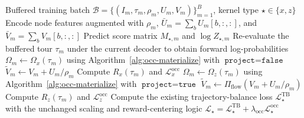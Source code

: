 \begin{algorithm}[t]
\caption{\textsc{KernelTrainStep}}
\label{alg:occ-kernel-step}
\begin{algorithmic}[1]
\REQUIRE Buffered training batch $\mathcal{B}=\{(I_m,\tau_m,\rho_m,U_m,V_m)\}_{m=1}^{B}$, kernel type $\star\in\{x,z\}$
    \STATE Encode node features augmented with $\rho_m$, $\bar U_m=\sum_b U_m[b,:,:]$, and $\bar V_m=\sum_b V_m[b,:,:]$
    \STATE Predict score matrix $M_{\star,m}$ and $\log Z_{\star,m}$
    \STATE Re-evaluate the buffered tour $\tau_m$ under the current decoder to obtain forward log-probabilities
        \STATE $\Omega_m \leftarrow \Omega_x(\tau_m)$ using Algorithm~\ref{alg:occ-materialize} with $\texttt{project}=\texttt{false}$
        \STATE $\widetilde V_m \leftarrow V_m + U_m/\rho_m$
        \STATE Compute $R_x(\tau_m)$ and $\mathcal{L}^{\mathrm{occ}}_x$
    \ELSE
        \STATE $\Omega_m \leftarrow \Omega_z(\tau_m)$ using Algorithm~\ref{alg:occ-materialize} with $\texttt{project}=\texttt{true}$
        \STATE $\widetilde V_m \leftarrow \Pi_{\mathrm{flow}}(V_m + U_m/\rho_m)$
        \STATE Compute $R_z(\tau_m)$ and $\mathcal{L}^{\mathrm{occ}}_z$
    \ENDIF
    \STATE Compute the existing trajectory-balance loss $\mathcal{L}^{\mathrm{TB}}_\star$ with the unchanged scaling and reward-centering logic
\ENDFOR
\STATE \RETURN $\mathcal{L}_\star=\mathcal{L}^{\mathrm{TB}}_\star+\lambda_{\mathrm{occ}}\mathcal{L}^{\mathrm{occ}}_\star$
\end{algorithmic}
\end{algorithm}

